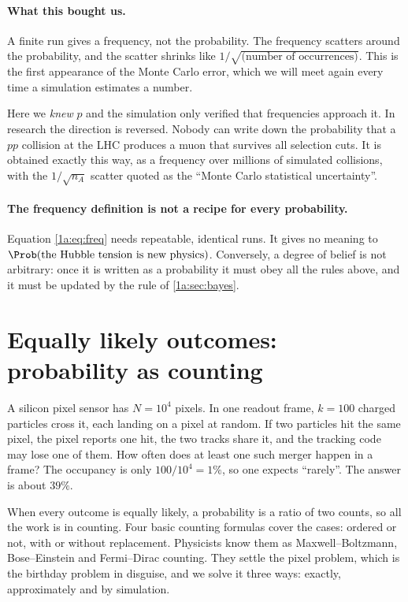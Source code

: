 \paragraph{What this bought us.}
A finite run gives a frequency, not the probability. The frequency scatters
around the probability, and the scatter shrinks like $1/\sqrt{\text{(number of
occurrences)}}$. This is the first appearance of the Monte Carlo error, which
we will meet again every time a simulation estimates a number.

\begin{inpractice}
Here we \emph{knew} $p$ and the simulation only verified that frequencies
approach it. In research the direction is reversed. Nobody can write down the
probability that a $pp$ collision at the LHC produces a muon that survives all
selection cuts. It is obtained exactly this way, as a frequency over millions
of simulated collisions, with the $1/\sqrt{n_A}$ scatter quoted as the
``Monte Carlo statistical uncertainty''.
\end{inpractice}

\paragraph{The frequency definition is not a recipe for every probability.}
Equation \eqref{1a:eq:freq} needs repeatable, identical runs. It gives no
meaning to $\Prob(\text{the Hubble tension is new physics})$. Conversely, a
degree of belief is not arbitrary: once it is written as a probability it must
obey all the rules above, and it must be updated by the rule of
\cref{1a:sec:bayes}.

\section{Equally likely outcomes: probability as counting}
\label{1a:sec:counting}

A silicon pixel sensor has $N=10^4$ pixels. In one readout frame, $k=100$
charged particles cross it, each landing on a pixel at random. If two particles
hit the same pixel, the pixel reports one hit, the two tracks share it, and the
tracking code may lose one of them. How often does at least one such merger
happen in a frame? The occupancy is only $100/10^4=1\%$, so one expects
``rarely''. The answer is about $39\%$.

When every outcome is equally likely, a probability is a ratio of two counts,
so all the work is in counting. Four basic counting formulas cover the cases:
ordered or not, with or without replacement. Physicists know them as
Maxwell--Boltzmann, Bose--Einstein and Fermi--Dirac counting. They settle the
pixel problem, which is the birthday problem in disguise, and we solve it three
ways: exactly, approximately and by simulation.

